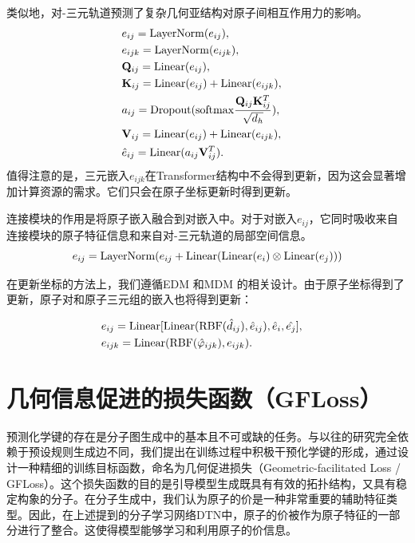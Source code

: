类似地，对-三元轨道预测了复杂几何亚结构对原子间相互作用力的影响。
\begin{eqnarray}
    &e_{ij} = {\rm LayerNorm}(e_{ij}),&\\
    &e_{ijk} = {\rm LayerNorm}(e_{ijk}),&\\
    &\mathbf{Q}_{ij} = {\rm Linear}(e_{ij}),& \\ 
    &\mathbf{K}_{ij} = {\rm Linear}(e_{ij}) + {\rm Linear}(e_{ijk}),& \\
    &a_{ij}= {\rm Dropout}({\rm softmax} \frac{\mathbf{Q}_{ij} \mathbf{K}_{ij}^T}{\sqrt{d_h}}), & \\
    &\mathbf{V}_{ij} = {\rm Linear}(e_{ij}) + {\rm Linear}(e_{ijk}),& \\
    &\hat{e}_{ij} = {\rm Linear}(a_{ij} \mathbf{V}_{ij}^T).&
\end{eqnarray}
值得注意的是，三元嵌入$e_{ijk}$在Transformer结构中不会得到更新，因为这会显著增加计算资源的需求。它们只会在原子坐标更新时得到更新。

连接模块的作用是将原子嵌入融合到对嵌入中。对于对嵌入$e_{ij}$，它同时吸收来自连接模块的原子特征信息和来自对-三元轨道的局部空间信息。
\begin{equation}
    e_{ij} = {\rm LayerNorm}(e_{ij} + {\rm Linear}({\rm Linear}(e_i) \otimes {\rm Linear}(e_j)))
\end{equation}

在更新坐标的方法上，我们遵循EDM \cite{edm_hoogeboom_22}和MDM \cite{mdm_huang_23}的相关设计。由于原子坐标得到了更新，原子对和原子三元组的嵌入也将得到更新：

\begin{eqnarray}
  &e_{ij} = {\rm Linear}[{\rm Linear}({\rm RBF}(\hat{d}_{ij}), \hat{e}_{ij}), \hat{e}_i, \hat{e_j}],& \\
  &e_{ijk} = {\rm Linear}({\rm RBF}(\hat{\varphi}_{ijk}), e_{ijk}). &
\end{eqnarray}

\section{几何信息促进的损失函数（GFLoss）}
预测化学键的存在是分子图生成中的基本且不可或缺的任务。与以往的研究完全依赖于预设规则生成边不同，我们提出在训练过程中积极干预化学键的形成，通过设计一种精细的训练目标函数，命名为几何促进损失（Geometric-facilitated Loss / GFLoss）。这个损失函数的目的是引导模型生成既具有有效的拓扑结构，又具有稳定构象的分子。在分子生成中，我们认为原子的价是一种非常重要的辅助特征类型。因此，在上述提到的分子学习网络DTN中，原子的价被作为原子特征的一部分进行了整合。这使得模型能够学习和利用原子的价信息。

